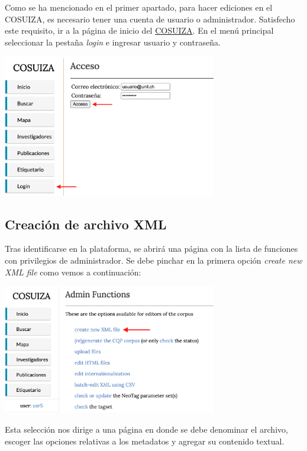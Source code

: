 \documentclass[
]{book}
\begin{document}
Como se ha mencionado en el primer apartado, para hacer ediciones en el COSUIZA, es necesario tener una cuenta de usuario o administrador.
Satisfecho este requisito, ir a la página de inicio del \href{https://cosuiza.unil.ch/}{COSUIZA}. En el menú principal seleccionar la pestaña \emph{login} e ingresar usuario y contraseña.

\includegraphics[width=0.7\textwidth,height=\textheight]{img/acceso.png}

\hypertarget{creaciuxf3n-de-archivo-xml}{%
\subsection*{Creación de archivo XML}\label{creaciuxf3n-de-archivo-xml}}

Tras identificarse en la plataforma, se abrirá una página con la lista de funciones con privilegios de administrador. Se debe pinchar en la primera opción \emph{create new XML file} como vemos a continuación:

\includegraphics[width=0.7\textwidth,height=\textheight]{img/crear_xml.png}

Esta selección nos dirige a una página en donde se debe denominar el archivo, escoger las opciones relativas a los metadatos y agregar su contenido textual.
\end{document}
